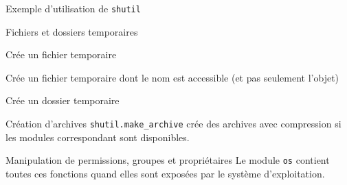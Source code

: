 \begin{frame}{Exemple d'utilisation de \texttt{shutil}}
\end{frame}

\begin{frame}{Fichiers et dossiers temporaires}
  \begin{description}[<+->]
    \item[\texttt{tempfile.TemporaryFile}] Crée un fichier temporaire
    \item[\texttt{tempfile.NamedTemporaryFile}] Crée un fichier temporaire dont le nom est accessible (et pas seulement l'objet)
    \item[\texttt{tempfile.TemporaryDirectory}] Crée un dossier temporaire
  \end{description}


\end{frame}

\begin{frame}{Création d'archives}
  \texttt{shutil.make\_archive} crée des archives avec compression si les modules correspondant sont disponibles.
\end{frame}

\begin{frame}{Manipulation de permissions, groupes et propriétaires}
  Le module \texttt{os} contient toutes ces fonctions quand elles sont exposées par le système d'exploitation.
\end{frame}
